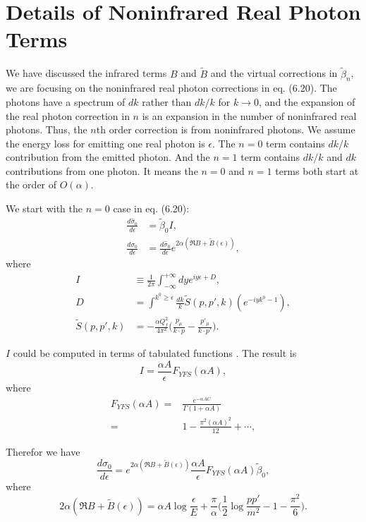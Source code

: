 \section{Details of Noninfrared Real Photon Terms}
We have discussed the infrared terms $B$ and $\tilde{B}$ and the virtual corrections in $\tilde{\beta}_n$, we are focusing on the noninfrared real photon corrections in eq. (6.20). The photons have a spectrum of $dk$ rather than $
dk/k$ for $k \to 0$, and the expansion of the real photon correction in $n$ is an expansion in the number of noninfrared real photons. Thus, the $n$th order correction is from noninfrared photons. We assume the energy loss for emitting one real photon is $\epsilon$. The $n=0$ term contains $dk/k$ contribution from the emitted photon. And the $n=1$ term contains $dk/k$ and $dk$ contributions from one photon. It means the $n = 0$ and $n = 1$ terms both start at the order of $O(\alpha)$.  

We start with the $n = 0$ case in eq. (6.20):
\begin{align}
\frac{d\hat{\sigma}_0}{d\epsilon} &= \tilde{\beta}_0 I,\nonumber\\
\frac{d\sigma_0}{d\epsilon} &= \frac{d\hat{\sigma}_0}{d\epsilon} e^{2\alpha(\Re B + \tilde{B}(\epsilon))},
\end{align}
where 
\begin{align}
I &\equiv \frac{1}{2\pi} \int_{-\infty}^{+\infty}dy e^{iy\epsilon +D},\nonumber\\
D &= \int^{k^0 \ge \epsilon}\frac{dk}{k}\tilde{S}(p,p',k)(e^{-iyk^0-1}),\nonumber\\
\tilde{S}(p,p',k) &= -\frac{\alpha Q_f^2}{4\pi^2}\big(\frac{p_\mu}{k\cdot p} - \frac{p'_\mu}{k\cdot p'}\big).
\end{align}

$I$ could be computed in terms of tabulated functions \cite{YS}. The result is 
\begin{equation}
I = \frac{\alpha A}{\epsilon} F_{YFS}(\alpha A),
\end{equation}
where 
\begin{align}
F_{YFS}(\alpha A) =& \frac{e^{-\alpha A C}}{\Gamma(1 + \alpha A)}\nonumber\\
=& 1 - \frac{\pi^2 (\alpha A)^2}{12} + \cdots,
\end{align}

Therefor we have 
\begin{equation}
\frac{d\sigma_0}{d\epsilon} = e^{2\alpha(\Re B + \tilde{B}(\epsilon))}\frac{\alpha A}{\epsilon} F_{YFS}(\alpha A)\tilde{\beta}_0,
\end{equation}
where
\begin{equation}
2\alpha (\Re B + \tilde{B}(\epsilon)) = \alpha A \log\frac{\epsilon}{E} + \frac{\pi}{\alpha}\Big(\frac{1}{2}\log\frac{pp'}{m^2} - 1 - \frac{\pi^2}{6}\Big).
\end{equation}

